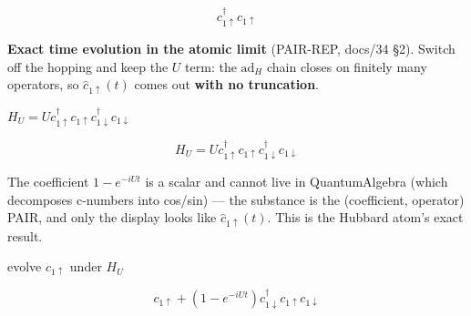 \documentclass[dvipdfmx]{article}
\begin{document}
\begin{equation}
  {c}_{1{\uparrow}}^{\dagger} {c}_{1{\uparrow}}
  \label{eq:E20}
\end{equation}

\textbf{Exact time evolution in the atomic limit} (PAIR-REP, docs/34 §2). Switch off the hopping and keep the $U$ term: the $\mathrm{ad}_H$ chain closes on finitely many operators, so $\hat c_{1\uparrow}(t)$ comes out \textbf{with no truncation}.

$H_U = U c^\dagger_{1\uparrow} c_{1\uparrow} c^\dagger_{1\downarrow} c_{1\downarrow}$

\begin{equation}
  H_U = U c^\dagger_{1\uparrow} c_{1\uparrow} c^\dagger_{1\downarrow} c_{1\downarrow}
  \label{eq:E21}
\end{equation}

The coefficient $1-e^{-iUt}$ is a scalar and cannot live in QuantumAlgebra (which decomposes c-numbers into cos/sin) — the substance is the (coefficient, operator) PAIR, and only the display looks like $\hat c_{1\uparrow}(t)$. This is the Hubbard atom's exact result.

evolve $c_{1\uparrow}$ under $H_U$

\begin{equation}
  c_{1\uparrow} + \left(1 - e^{- i U t}\right) c^{\dagger}_{1\downarrow} c_{1\uparrow} c_{1\downarrow}
  \label{eq:E22}
\end{equation}
\end{document}
